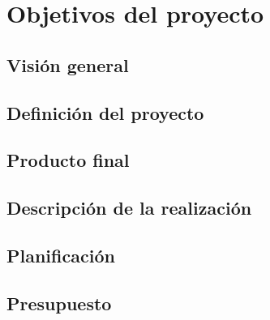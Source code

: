 \chapter{Objetivos del proyecto}

\section{Visión general}

\section{Definición del proyecto}

\section{Producto final}

\section{Descripción de la realización}

\section{Planificación}

\section{Presupuesto}
